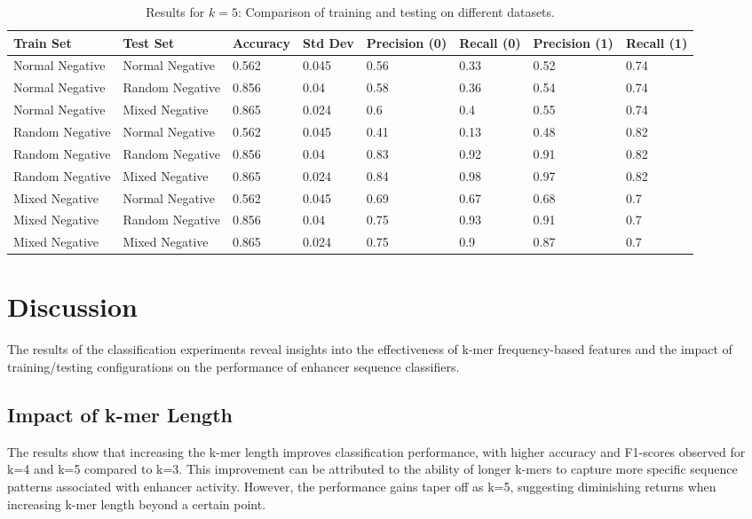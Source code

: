\documentclass[11pt, a4paper, hidelinks]{article}
\begin{document}
\begin{table}[H]
    \centering
    \begin{tabular}{|l|l|l|l|l|l|l|l|}
        \hline
        \textbf{Train Set} & \textbf{Test Set} & \textbf{Accuracy} & \textbf{Std Dev} & \textbf{Precision (0)} & \textbf{Recall (0)} & \textbf{Precision (1)} & \textbf{Recall (1)} \\
        \hline
        Normal Negative & Normal Negative & 0.562 & 0.045 & 0.56 & 0.33 & 0.52 & 0.74 \\
        \hline
        Normal Negative & Random Negative & 0.856 & 0.04 & 0.58 & 0.36 & 0.54 & 0.74 \\
        \hline
        Normal Negative & Mixed Negative & 0.865 & 0.024 & 0.6 & 0.4 & 0.55 & 0.74 \\
        \hline
        Random Negative & Normal Negative & 0.562 & 0.045 & 0.41 & 0.13 & 0.48 & 0.82 \\
        \hline
        Random Negative & Random Negative & 0.856 & 0.04 & 0.83 & 0.92 & 0.91 & 0.82 \\
        \hline
        Random Negative & Mixed Negative & 0.865 & 0.024 & 0.84 & 0.98 & 0.97 & 0.82 \\
        \hline
        Mixed Negative & Normal Negative & 0.562 & 0.045 & 0.69 & 0.67 & 0.68 & 0.7 \\
        \hline
        Mixed Negative & Random Negative & 0.856 & 0.04 & 0.75 & 0.93 & 0.91 & 0.7 \\
        \hline
        Mixed Negative & Mixed Negative & 0.865 & 0.024 & 0.75 & 0.9 & 0.87 & 0.7 \\
        \hline
    \end{tabular}
    \caption{Results for \(k = 5\): Comparison of training and testing on different datasets.}
    \label{tab:results_k5}
\end{table}

\section{Discussion}\label{sec:discussion}

The results of the classification experiments reveal insights into the effectiveness of k-mer frequency-based features and the impact of training/testing configurations on the performance of enhancer sequence classifiers.

\subsection{Impact of k-mer Length}\label{subsec:impact-of-k-mer-length}
The results show that increasing the k-mer length improves classification performance, with higher accuracy and F1-scores observed for k=4 and k=5 compared to k=3. This improvement can be attributed to the ability of longer k-mers to capture more specific sequence patterns associated with enhancer activity. However, the performance gains taper off as k=5, suggesting diminishing returns when increasing k-mer length beyond a certain point.
\end{document}
